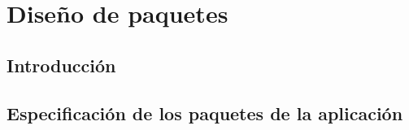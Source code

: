 \chapter{Diseño de paquetes} \label{cap:diseño-paquetes}


\section{Introducción}



 \section{Especificación de los paquetes de la aplicación}






